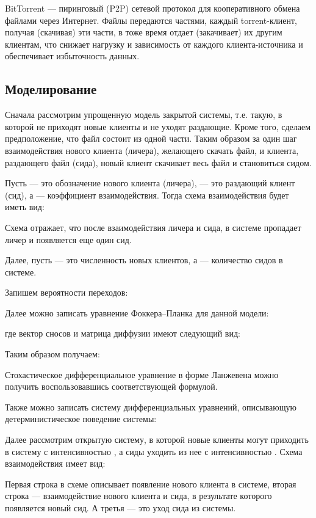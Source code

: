 \documentclass[floatfix,
showkeys,
twocolumn, nofootinbib, superscriptaddress, ]{revtex4-1}
\begin{document}
BitTorrent --- пиринговый (P2P) сетевой протокол для кооперативного
обмена файлами через Интернет. Файлы передаются частями, каждый
torrent-клиент, получая (скачивая) эти части, в тоже время отдает
(закачивает) их другим клиентам, что снижает нагрузку и зависимость от
каждого клиента-источника и обеспечивает избыточность данных.

\subsection{Моделирование}

Сначала рассмотрим упрощенную модель закрытой системы, т.е. такую, в
которой не приходят новые клиенты и не уходят раздающие. Кроме того,
сделаем предположение, что файл состоит из одной части. Таким образом
за один шаг взаимодействия нового клиента (личера), желающего скачать
файл, и клиента, раздающего файл (сида), новый клиент скачивает весь
файл и становиться сидом.


Пусть  --- это обозначение нового клиента (личера),  --- это
раздающий клиент (сид), а  --- коэффициент
взаимодействия. Тогда схема взаимодействия будет иметь вид:




Схема отражает, что после взаимодействия личера и сида, в системе
пропадает личер и появляется еще один сид.

Далее, пусть  --- это численность новых клиентов, а  ---
количество сидов в системе.

Запишем вероятности переходов:


Далее можно записать уравнение Фоккера--Планка для данной модели:

где вектор сносов и матрица диффузии имеют следующий вид:


Таким образом получаем:



Стохастическое дифференциальное уравнение в форме Ланжевена можно
получить воспользовавшись соответствующей формулой.

Также можно записать систему дифференциальных уравнений, описывающую
детерминистическое поведение системы:


Далее рассмотрим открытую систему, в которой новые клиенты могут
приходить в систему с интенсивностью , а сиды уходить из нее
с интенсивностью . Схема взаимодействия имеет вид:




Первая строка в схеме описывает появление нового клиента в системе,
вторая строка --- взаимодействие нового клиента и сида, в результате
которого появляется новый сид. А третья --- это уход сида из системы.
\end{document}
